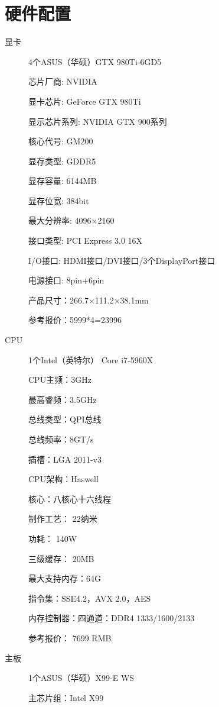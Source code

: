 \section{硬件配置}
\begin{description}
\item[显卡] 4个ASUS（华硕）GTX 980Ti-6GD5
\begin{shaded}
\scriptsize{
芯片厂商: NVIDIA

显卡芯片: GeForce GTX 980Ti

显示芯片系列: NVIDIA GTX 900系列

核心代号: GM200

显存类型: GDDR5

显存容量: 6144MB

显存位宽: 384bit

最大分辨率: 4096×2160

接口类型: PCI Express 3.0 16X

I/O接口: HDMI接口/DVI接口/3个DisplayPort接口

电源接口: 8pin+6pin

产品尺寸：266.7×111.2×38.1mm

参考报价：5999*4=23996} 
\end{shaded}   
\item[CPU] 1个Intel（英特尔） Core i7-5960X
\begin{shaded}
\scriptsize{
CPU主频：3GHz

最高睿频：3.5GHz 

总线类型：QPI总线

总线频率：8GT/s

插槽：LGA 2011-v3 

CPU架构：Haswell

核心：八核心十六线程

制作工艺： 22纳米

功耗： 140W

三级缓存： 20MB

最大支持内存：64G

指令集：SSE4.2，AVX 2.0，AES

内存控制器：四通道：DDR4 1333/1600/2133

参考报价： 7699 RMB} 
\end{shaded}   
\item[主板] 1个ASUS（华硕）X99-E WS
\begin{shaded}
\scriptsize{
主芯片组：Intel X99

}
\end{shaded}
\end{description}
